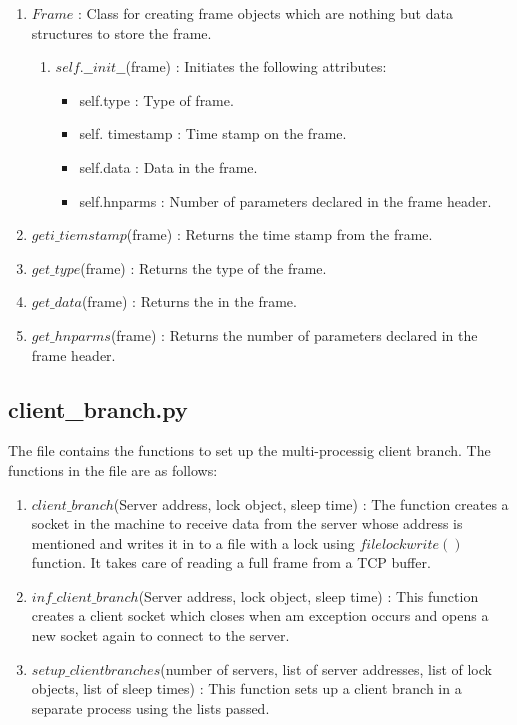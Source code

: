 \begin{enumerate}
\begin{enumerate}
		\end{enumerate}
	\item $Frame$ : Class for creating frame objects which are nothing but data
		structures to store the frame.
		\begin{enumerate}
			\item $self.\_\_init\_\_$(frame) : Initiates the following attributes:
				\begin{itemize}
					\item self.type : Type of frame.
					\item self. timestamp : Time stamp on the frame.
					\item self.data : Data in the frame.
					\item self.hnparms : Number of parameters declared in the
						frame header.
				\end{itemize}
		\end{enumerate}
	\item $geti\_tiemstamp$(frame) : Returns the time stamp from the frame.
	\item $get\_type$(frame) : Returns the type of the frame.
	\item $get\_data$(frame) : Returns the in the frame.
	\item $get\_hnparms$(frame) : Returns the number of parameters declared in
		the frame header.
\end{enumerate}


\subsection{client\_branch.py}
The file contains the functions to set up the multi-processig client branch.
The functions in the file are as follows:
\begin{enumerate}
	\item $client\_branch$(Server address, lock object, sleep time) : The
		function creates a socket in the machine to receive data from the
		server whose address is mentioned and writes it in to a file with a
		lock using $filelockwrite()$ function. It takes care of reading a full
		frame from a TCP buffer.
	\item $inf\_client\_branch$(Server address, lock object, sleep time) : This
		function creates a client socket which closes when am exception occurs
		and opens a new socket again to connect to the server.
	\item $setup\_clientbranches$(number of servers, list of server addresses,
		list of lock objects, list of sleep times) : This function sets up a
		client branch in a separate process using the lists passed.
\end{enumerate}


